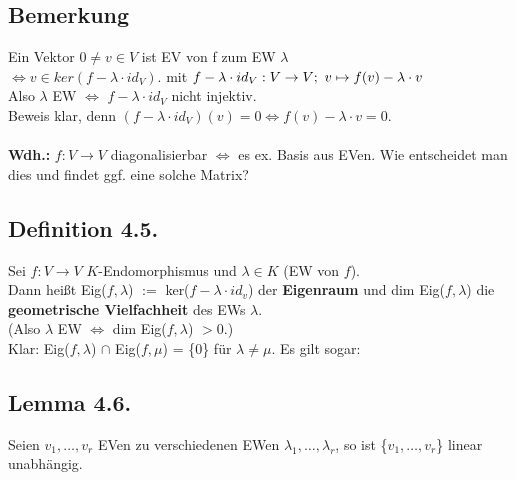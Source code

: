 \documentclass[a4paper, 12pt]{extarticle}
\newcommand{\tn}[1]{\textnormal {#1}}
\begin{document}
\subsection*{Bemerkung}
Ein Vektor $0 \neq v\in V$ ist EV von f zum EW $\lambda$ \\
$\Leftrightarrow v\in ker(f-\lambda\cdot id_V)$. mit $f-\lambda\cdot id_V:V\to V;\tn{ } v \mapsto f(v)-\lambda\cdot v$\\
Also $\lambda$ EW $\Leftrightarrow$ $f-\lambda\cdot id_V$ nicht injektiv.\\
Beweis klar, denn $(f-\lambda\cdot id_V)(v)=0 \Leftrightarrow f(v)-\lambda\cdot v=0$.\\\\
\textbf{Wdh.:} $f:V\longrightarrow V$ diagonalisierbar $\Leftrightarrow$ es ex. Basis aus EVen.
Wie entscheidet man dies und findet ggf. eine solche Matrix?\\

\subsection*{Definition 4.5.}
Sei $f:V\longrightarrow V$ $K$-Endomorphismus und $\lambda \in K$ (EW von $f$).\\
Dann heißt Eig($f, \lambda$) $:=$ ker($f-\lambda \cdot id_v$) der \textbf{Eigenraum} und dim Eig($f, \lambda$) die \textbf{geometrische Vielfachheit} des EWs $\lambda$.\\
(Also $\lambda$ EW $\Leftrightarrow$ dim Eig($f, \lambda$) $> 0$.)\\
Klar: Eig($f, \lambda$) $\cap$ Eig($f, \mu$) = \{0\} für $\lambda \neq \mu$. Es gilt sogar:
\subsection*{Lemma 4.6.}
Seien $v_1, \dots, v_r$ EVen zu verschiedenen EWen $\lambda_1, \dots, \lambda_r$, so ist \{$v_1, \dots, v_r$\} linear unabhängig.
\end{document}
